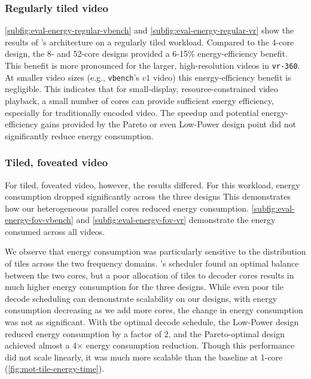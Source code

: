 \subsubsection{Regularly tiled video}

\ref{subfig:eval-energy-regular-vbench} and \ref{subfig:eval-energy-regular-vr} show the results of \nameArch's architecture on a regularly tiled workload.
Compared to the 4-core design, the 8- and 52-core designs provided a 6-15\% energy-efficiency benefit.
This benefit is more pronounced for the larger, high-resolution videos in \texttt{vr-360}.
At smaller video sizes (e.g., \texttt{vbench}'s $v1$ video) this energy-efficiency benefit is negligible.
This indicates that for small-display, resource-constrained video playback, a small number of cores can provide sufficient energy efficiency, especially for traditionally encoded video.
The speedup and potential energy-efficiency gains provided by the Pareto or even Low-Power design point did not significantly reduce energy consumption.

\subsubsection{Tiled, foveated video}
For tiled, foveated video, however, the results differed.
For this workload, energy consumption dropped significantly across the three designs
This demonstrates how our heterogeneous parallel cores reduced energy consumption.
\ref{subfig:eval-energy-fov-vbench} and \ref{subfig:eval-energy-fov-vr} demonstrate the energy consumed across all videos.

We observe that energy consumption was particularly sensitive to the distribution of tiles across the two frequency domains.
\nameArch's scheduler found an optimal balance between the two cores, but a poor allocation of tiles to decoder cores results in much higher energy consumption for the three \nameArch designs.
While even poor tile decode scheduling can demonstrate scalability on our designs, with energy consumption decreasing as we add more cores, the change in energy consumption was not as significant.
With the optimal decode schedule, the Low-Power design reduced energy consumption by a factor of 2, and the Pareto-optimal design achieved almost a 4$\times$ energy consumption reduction.
Though this performance did not scale linearly, it was much more scalable than the baseline at 1-core (\ref{fig:mot-tile-energy-time}).

